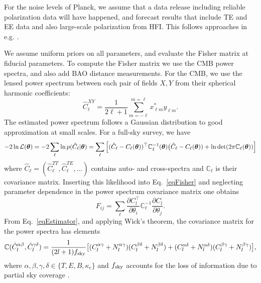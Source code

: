 For the noise levels of Planck, we assume that a data release including reliable polarization data will have happened, and forecast results that include TE and EE data and also large-scale polarization from HFI. This follows approaches in e.g. \cite{allison/etal:2015}.

We assume uniform priors on all parameters, and evaluate the Fisher matrix at fiducial parameters. To compute the Fisher matrix we use the CMB power spectra, and also add BAO distance measurements. For the CMB, we use the lensed power spectrum between each pair of fields $X, Y$ from their spherical harmonic coefficients:
%
\begin{equation}
\label{eqEstimator}
\hat{C}^{XY}_\ell = \frac{1}{2\ell+1}\sum_{m=-\ell}^{m=\ell} x^{*}_{\ell m} y_{\ell m}.
\end{equation}
%
The estimated power spectrum follows a Gaussian distribution to good approximation at small scales. For a full-sky survey, we have 
%
\begin{equation}
-2\ln\mathcal{L}(\boldsymbol{\theta}) = -2\sum_\ell \ln p( \hat{C}_\ell | \boldsymbol{\theta}) \\
=  \sum_\ell  \Big[ (\hat{C}_\ell - C_\ell(\boldsymbol{\theta}) )^\top  \mathbb{C}^{-1}_\ell(\boldsymbol{\theta}) \big(\hat{C}_\ell - C_\ell(\boldsymbol{\theta})) + \ln \det(2 \pi \mathbb{C}_\ell(\boldsymbol{\theta})) \Big]
\end{equation}
%
where $ \hat{C}_\ell = (\hat{C}_\ell^{TT}, \hat{C}_\ell^{TE}, ...) $ contains auto- and cross-spectra and $\mathbb{C}_\ell$ is their covariance matrix. Inserting this likelihood into Eq.~\ref{eqFisher} and neglecting parameter dependence in the power spectrum covariance matrix one obtains
%
\begin{equation}
F_{ij} = \sum_\ell \frac{\partial C^\top_l}{\partial \theta_i} \mathbb{C}^{-1}_\ell \frac{\partial C_l}{\partial \theta_j}.
\end{equation}
%
From Eq.~\ref{eqEstimator}, and applying Wick's theorem, the covariance matrix for the power spectra has elements
%
\begin{equation}
\mathbb{C}(\hat{C}_l^{\alpha \beta}, \hat{C}_l^{\gamma \delta}) = \frac{1}{(2l+1)f_{\rm sky}} \big[ (C_l^{\alpha \gamma} + N_l^{\alpha \gamma}) (C_l^{\beta \delta} + N_l^{\beta \delta})  \\
+ (C_l^{\alpha \delta} + N_l^{\alpha \delta}) (C_l^{\beta \gamma} + N_l^{\beta \gamma}) \big],
\end{equation}
%
where $\alpha, \beta, \gamma, \delta \in \{T, E, B, \kappa_c\}$ and $f_{\rm sky}$ accounts for the loss of information due to partial sky coverage \cite{Hobson:1996,dePutter:2009}. 


